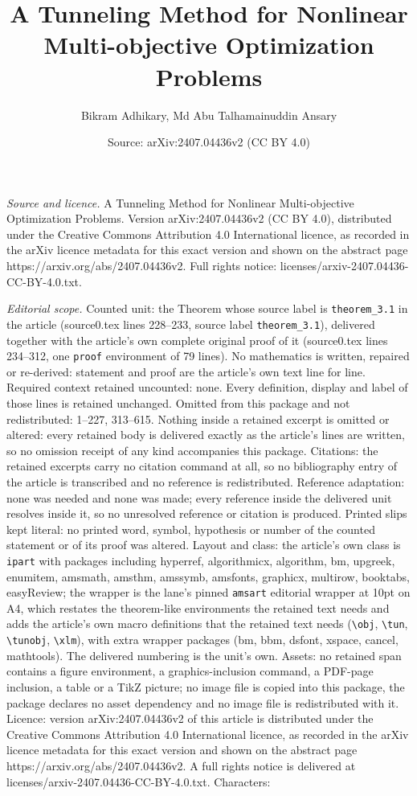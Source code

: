 \documentclass[10pt,a4paper]{amsart}
\title[A Tunneling Method for Nonlinear Multi-objective Optimizatio]{A Tunneling Method for Nonlinear Multi-objective Optimization Problems}
\author{Bikram Adhikary, Md Abu Talhamainuddin Ansary}
\date{Source: arXiv:2407.04436v2 (CC BY 4.0)}
\begin{document}
\maketitle

\noindent\emph{Source and licence.} A Tunneling Method for Nonlinear Multi-objective Optimization Problems. Version arXiv:2407.04436v2 (CC BY 4.0), distributed under the Creative Commons Attribution 4.0 International licence, as recorded in the arXiv licence metadata for this exact version and shown on the abstract page https://arxiv.org/abs/2407.04436v2. Full rights notice: licenses/arxiv-2407.04436-CC-BY-4.0.txt.\par\smallskip

\noindent\textit{Editorial scope.} Counted unit: the Theorem whose source label is \texttt{theorem\_3.1} in the article (source0.tex lines 228--233, source label \texttt{theorem\_3.1}), delivered together with the article's own complete original proof of it (source0.tex lines 234--312, one \texttt{proof} environment of 79 lines). No mathematics is written, repaired or re-derived: statement and proof are the article's own text line for line. Required context retained uncounted: none. Every definition, display and label of those lines is retained unchanged. Omitted from this package and not redistributed: 1--227, 313--615. Nothing inside a retained excerpt is omitted or altered: every retained body is delivered exactly as the article's lines are written, so no omission receipt of any kind accompanies this package. Citations: the retained excerpts carry no citation command at all, so no bibliography entry of the article is transcribed and no reference is redistributed. Reference adaptation: none was needed and none was made; every reference inside the delivered unit resolves inside it, so no unresolved reference or citation is produced. Printed slips kept literal: no printed word, symbol, hypothesis or number of the counted statement or of its proof was altered. Layout and class: the article's own class is \texttt{ipart} with packages including hyperref, algorithmicx, algorithm, bm, upgreek, enumitem, amsmath, amsthm, amssymb, amsfonts, graphicx, multirow, booktabs, easyReview; the wrapper is the lane's pinned \texttt{amsart} editorial wrapper at 10pt on A4, which restates the theorem-like environments the retained text needs and adds the article's own macro definitions that the retained text needs (\texttt{\textbackslash obj}, \texttt{\textbackslash tun}, \texttt{\textbackslash tunobj}, \texttt{\textbackslash xlm}), with extra wrapper packages (bm, bbm, dsfont, xspace, cancel, mathtools). The delivered numbering is the unit's own. Assets: no retained span contains a figure environment, a graphics-inclusion command, a PDF-page inclusion, a table or a TikZ picture; no image file is copied into this package, the package declares no asset dependency and no image file is redistributed with it. Licence: version arXiv:2407.04436v2 of this article is distributed under the Creative Commons Attribution 4.0 International licence, as recorded in the arXiv licence metadata for this exact version and shown on the abstract page https://arxiv.org/abs/2407.04436v2. A full rights notice is delivered at licenses/arxiv-2407.04436-CC-BY-4.0.txt. Characters: 
\end{document}
